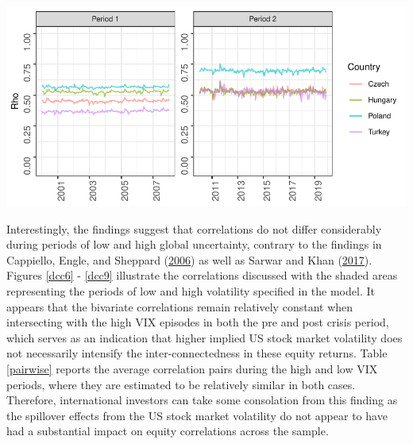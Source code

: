 \documentclass[11pt,preprint, authoryear]{elsarticle}
\let\origfigure\figure
\let\endorigfigure\endfigure
\renewenvironment{figure}[1][2] {
    \expandafter\origfigure\expandafter[H]
} {
    \endorigfigure
}
\numberwithin{equation}{section}
\numberwithin{figure}{section}
\numberwithin{table}{section}
\begin{document}
\begin{figure}[H]

{\centering \includegraphics{Template_files/figure-latex/dcc4-1} 

}

\caption{South Africa-Europe DCC\label{dcc4}}\label{fig:dcc4}
\end{figure}

Interestingly, the findings suggest that correlations do not differ
considerably during periods of low and high global uncertainty, contrary
to the findings in Cappiello, Engle, and Sheppard
(\protect\hyperlink{ref-cappiello2006asymmetric}{2006}) as well as
Sarwar and Khan (\protect\hyperlink{ref-sarwarimpact}{2017}). Figures
\ref{dcc6} - \ref{dcc9} illustrate the correlations discussed with the
shaded areas representing the periods of low and high volatility
specified in the model. It appears that the bivariate correlations
remain relatively constant when intersecting with the high VIX episodes
in both the pre and post crisis period, which serves as an indication
that higher implied US stock market volatility does not necessarily
intensify the inter-connectedness in these equity returns. Table
\ref{pairwise} reports the average correlation pairs during the high and
low VIX periods, where they are estimated to be relatively similar in
both cases. Therefore, international investors can take some consolation
from this finding as the spillover effects from the US stock market
volatility do not appear to have had a substantial impact on equity
correlations across the sample.
\end{document}

